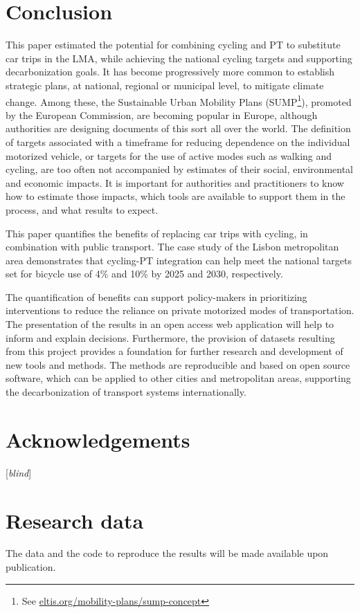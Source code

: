 \documentclass[review, doubleblind, 3p,
authoryear]{elsarticle} %
\begin{document}
\section{Conclusion}\label{conclusion}

This paper estimated the potential for combining cycling and PT to
substitute car trips in the LMA, while achieving the national cycling
targets and supporting decarbonization goals. It has become
progressively more common to establish strategic plans, at national,
regional or municipal level, to mitigate climate change. Among these,
the Sustainable Urban Mobility Plans (SUMP\footnote{See
  \href{https://www.eltis.org/mobility-plans/sump-concept}{eltis.org/mobility-plans/sump-concept}}),
promoted by the European Commission, are becoming popular in Europe,
although authorities are designing documents of this sort all over the
world. The definition of targets associated with a timeframe for
reducing dependence on the individual motorized vehicle, or targets for
the use of active modes such as walking and cycling, are too often not
accompanied by estimates of their social, environmental and economic
impacts. It is important for authorities and practitioners to know how
to estimate those impacts, which tools are available to support them in
the process, and what results to expect.

This paper quantifies the benefits of replacing car trips with cycling,
in combination with public transport. The case study of the Lisbon
metropolitan area demonstrates that cycling-PT integration can help meet
the national targets set for bicycle use of 4\% and 10\% by 2025 and
2030, respectively.

The quantification of benefits can support policy-makers in prioritizing
interventions to reduce the reliance on private motorized modes of
transportation. The presentation of the results in an open access web
application will help to inform and explain decisions. Furthermore, the
provision of datasets resulting from this project provides a foundation
for further research and development of new tools and methods. The
methods are reproducible and based on open source software, which can be
applied to other cities and metropolitan areas, supporting the
decarbonization of transport systems internationally.

\section*{Acknowledgements}\label{acknowledgements}

{[}\emph{blind}{]}

\section*{Research data}\label{research-data}

The data and the code to reproduce the results will be made available
upon publication.

\renewcommand\refname{References}

\end{document}
